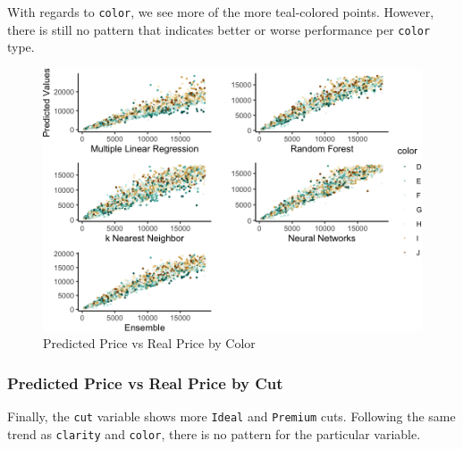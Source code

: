 \documentclass[
  paper=a4,
  ,captions=tableheading
]{scrartcl}
\begin{document}
With regards to \texttt{color}, we see more of the more teal-colored
points. However, there is still no pattern that indicates better or
worse performance per \texttt{color} type.

\begin{figure}[H]

{\centering \includegraphics[width=\linewidth,]{Diamonds_PDF_files/figure-latex/Summ Color Plots-1}

}

\caption{Predicted Price vs Real Price by Color}\label{fig:Summ Color Plots}
\end{figure}

\newpage

\hypertarget{predicted-price-vs-real-price-by-cut}{%
\subsubsection{Predicted Price vs Real Price by
Cut}\label{predicted-price-vs-real-price-by-cut}}

Finally, the \texttt{cut} variable shows more \texttt{Ideal} and
\texttt{Premium} cuts. Following the same trend as \texttt{clarity} and
\texttt{color}, there is no pattern for the particular variable.
\end{document}
